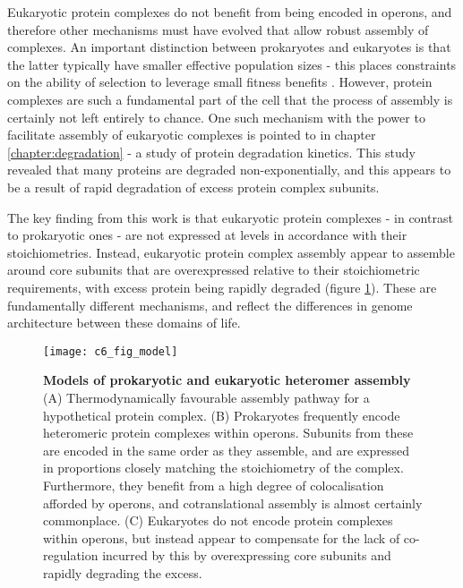 \documentclass[a4paper,11pt,twoside,openright]{scrbook}
\begin{document}
Eukaryotic protein complexes do not benefit from being encoded in operons, and therefore other mechanisms must have evolved that allow robust assembly of complexes. An important distinction between prokaryotes and eukaryotes is that the latter typically have smaller effective population sizes - this places constraints on the ability of selection to leverage small fitness benefits \cite{Kimura1962,Lynch2011}. However, protein complexes are such a fundamental part of the cell that the process of assembly is certainly not left entirely to chance. One such mechanism with the power to facilitate assembly of eukaryotic complexes is pointed to in chapter \ref{chapter:degradation} - a study of protein degradation kinetics. This study revealed that many proteins are degraded non-exponentially, and this appears to be a result of rapid degradation of excess protein complex subunits.

The key finding from this work is that eukaryotic protein complexes - in contrast to prokaryotic ones \cite{Li2014b} - are not expressed at levels in accordance with their stoichiometries. Instead, eukaryotic protein complex assembly appear to assemble around core subunits that are overexpressed relative to their stoichiometric requirements, with excess protein being rapidly degraded (figure \ref{figure:conclusionmodel}). These are fundamentally different mechanisms, and reflect the differences in genome architecture between these domains of life.

\begin{figure}
    \texttt{[image: c6\_fig\_model]}
    \caption[Models of prokaryotic and eukaryotic heteromer assembly]{\sffamily \textbf{Models of prokaryotic and eukaryotic heteromer assembly} \\ \small (A) Thermodynamically favourable assembly pathway for a hypothetical protein complex. (B) Prokaryotes frequently encode heteromeric protein complexes within operons. Subunits from these are encoded in the same order as they assemble, and are expressed in proportions closely matching the stoichiometry of the complex. Furthermore, they benefit from a high degree of colocalisation afforded by operons, and cotranslational assembly is almost certainly commonplace. (C) Eukaryotes do not encode protein complexes within operons, but instead appear to compensate for the lack of co-regulation incurred by this by overexpressing core subunits and rapidly degrading the excess.}
    \label{figure:conclusionmodel}
\end{figure}
\end{document}
